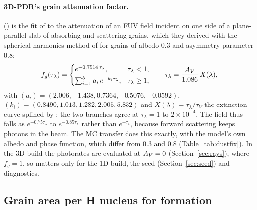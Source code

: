 \paragraph{3D-PDR's grain attenuation factor.} 
() is the fit of
\citet[their eqs.~1a--1d]{WagenblastHartquist1989} to the attenuation of an
FUV field incident on one side of a plane-parallel slab of absorbing and
scattering grains, which they derived with the spherical-harmonics method of
\citet{Flannery1980} for grains of albedo 0.3 and asymmetry parameter 0.8:
\begin{equation}
  f_g(\tau_\lambda) = \begin{cases}
     e^{-0.7514\,\tau_\lambda}, & \tau_\lambda<1,\\[2pt]
     \sum_{i=1}^{5} a_i\,e^{-k_i\tau_\lambda}, & \tau_\lambda\ge1,
  \end{cases}
  \qquad \tau_\lambda = \frac{A_{V}}{1.086}\,X(\lambda),
\end{equation}
with $(a_i)=(2.006,-1.438,0.7364,-0.5076,-0.0592)$,
$(k_i)=(0.8490,1.013,1.282,2.005,5.832)$ and $X(\lambda)=\tau_\lambda/\tau_V$
the extinction curve splined by ; the two branches agree at
$\tau_\lambda=1$ to $2\times10^{-4}$. The field thus falls as
$e^{-0.75\tau_\lambda}$ to $e^{-0.85\tau_\lambda}$ rather than $e^{-\tau_\lambda}$,
because forward scattering keeps photons in the beam. The MC transfer does
this exactly, with the model's own albedo and phase function, which differ
from 0.3 and 0.8 (Table~\ref{tab:dustfix}). In the 3D build the photorates are
evaluated at $A_{V}=0$ (Section~\ref{sec:rays}), where $f_g=1$, so 
matters only for the 1D build, the seed (Section~\ref{sec:seed}) and
diagnostics.

\subsection{Grain area per H nucleus for \texorpdfstring{\Htwo}{H2} formation}
\label{sec:grainarea}

